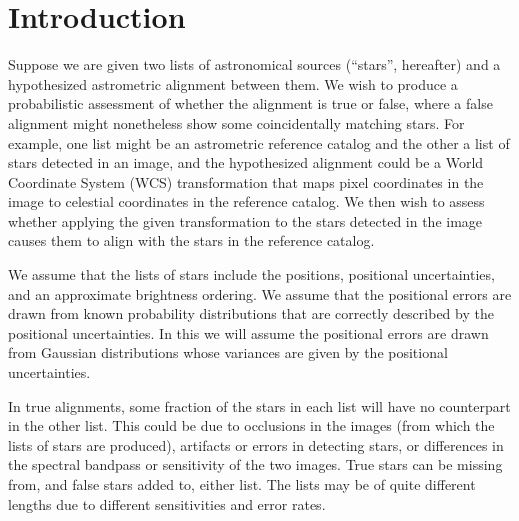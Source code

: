 \newcommand{\mcc}[1]{\makebox[6em][c]{#1}}

\newcommand{\jitterof}[2]{\sigma^2_{#1,#2}}
\newcommand{\jitterij}{\jitterof{i}{j}}

\newcommand{\oneminusd}{1\!-\!d}
\newcommand{\nref}{{N_r}}
\newcommand{\ntest}{{N_t}}
\newcommand{\nunder}{{N_u}}





\section{Introduction}


Suppose we are given two lists of astronomical sources (``stars'',
hereafter) and a hypothesized astrometric alignment between them.  We
wish to produce a probabilistic assessment of whether the alignment is
true or false, where a false alignment might nonetheless show some
coincidentally matching stars.  For example, one list might be an
astrometric reference catalog and the other a list of stars detected
in an image, and the hypothesized alignment could be a World
Coordinate System (WCS) transformation that maps pixel coordinates in
the image to celestial coordinates in the reference catalog.  We then
wish to assess whether applying the given transformation to the stars
detected in the image causes them to align with the stars in the
reference catalog.


We assume that the lists of stars include the positions, positional
uncertainties, and an approximate brightness ordering.  We assume that
the positional errors are drawn from known probability distributions
that are correctly described by the positional uncertainties.  In this
\doctype we will assume the positional errors are drawn from Gaussian
distributions whose variances are given by the positional
uncertainties.


In true alignments, some fraction of the stars in each list will have
no counterpart in the other list.  This could be due to occlusions in
the images (from which the lists of stars are produced), artifacts or
errors in detecting stars, or differences in the spectral bandpass or
sensitivity of the two images.  True stars can be missing from, and
false stars added to, either list.  The lists may be of quite
different lengths due to different sensitivities and error rates.


